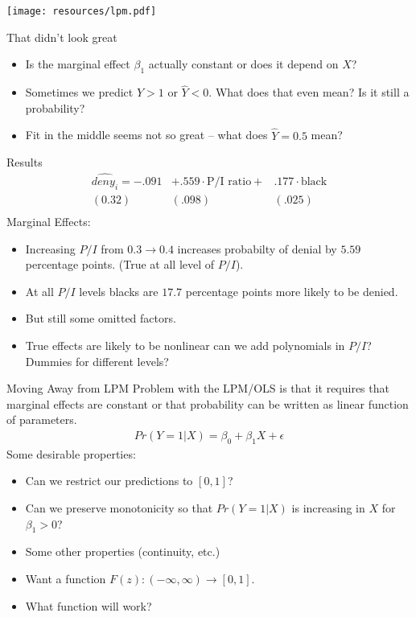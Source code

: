 \documentclass[aspectratio=169]{beamer}
\begin{document}
\begin{frame}
\begin{center}
\texttt{[image: resources/lpm.pdf]}\\
\end{center}
\end{frame}

\begin{frame}{That didn't look great}
\begin{itemize}
\item Is the marginal effect $\beta_1$ actually constant or does it depend on $X$?
\item Sometimes we predict $\hat{Y} >1$ or $\hat{Y} <0$. What does that even mean? Is it still a probability?
\item Fit in the middle seems not so great -- what does $\hat{Y} = 0.5$ mean?
\end{itemize}
\end{frame}

\begin{frame}{Results}
\begin{eqnarray*}
\widehat{deny_i}= -.091& + .559 \cdot \text{P/I ratio} + &.177 \cdot \text{black} \\
(0.32)&( .098) & (.025)\\
\end{eqnarray*}
Marginal Effects: 
\begin{itemize}
\item Increasing $P/I$ from $0.3 \rightarrow 0.4$ increases probabilty of denial by $5.59$ percentage points. (True at all level of $P/I$).
\item At all $P/I$ levels blacks are $17.7$ percentage points more likely to be denied.
\item But still some omitted factors.
\item True effects are likely to be \alert{nonlinear} can we add polynomials in $P/I$? Dummies for different levels? 
\end{itemize}
\end{frame}


\begin{frame}{Moving Away from LPM}
Problem with the LPM/OLS is that it requires that \alert{marginal effects are constant} or that probability can be written as linear function of parameters.
\begin{eqnarray*}
Pr(Y=1 | X) = \beta_0 + \beta_1 X+ \epsilon
\end{eqnarray*}
Some desirable properties:
\begin{itemize}
\item Can we restrict our predictions to $[0,1]$?
\item Can we preserve \alert{monotonicity} so that $Pr(Y=1| X)$ is increasing in $X$ for $\beta_1 >0$?
\item Some other properties (continuity, etc.) \pause
\item Want a function $F(z): (-\infty,\infty) \rightarrow [0,1]$.
\item What function will work?
\end{itemize}
\end{frame}
\end{document}
